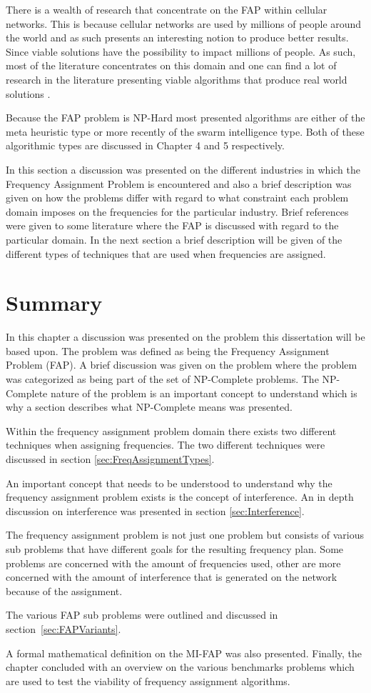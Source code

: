 There is a wealth of research that concentrate on the FAP within cellular networks. This is because cellular networks are used by millions of people around the world and as such presents an interesting notion to produce better results. Since viable solutions have the possibility to impact millions of people. As such, most of the literature concentrates on this domain and one can find a lot of research in the literature presenting viable algorithms that produce real world solutions \cite{Eisenblatter}. 

Because the FAP problem is NP-Hard most presented algorithms are either of the meta heuristic type or more recently of the swarm intelligence type. Both of these algorithmic types are discussed in Chapter 4 and 5 respectively.

In this section a discussion was presented on the different industries in which the Frequency Assignment Problem is encountered and also a brief description was given on how the problems differ with regard to what constraint each problem domain imposes on the frequencies for the particular industry. 
Brief references were given to some literature where the FAP is discussed with regard to the particular domain. In the next section a brief description will be given of the different types of techniques that are used when frequencies are assigned.
\section{Summary}
In this chapter a discussion was presented on the problem this dissertation will be based upon. The problem was defined as being the Frequency Assignment Problem (FAP). A brief discussion was given on the problem where the problem was categorized as being part of the set of NP-Complete problems. The NP-Complete nature of the problem is an important concept to understand which is why a section describes what NP-Complete means was presented.

Within the frequency assignment problem domain there exists two different techniques when assigning frequencies. The two different techniques were discussed in section \ref{sec:FreqAssignmentTypes}. 

An important concept that needs to be understood to understand why the frequency assignment problem exists is the concept of interference. An in depth discussion on interference was presented in section \ref{sec:Interference}.

The frequency assignment problem is not just one problem but consists of various sub problems that have different goals for the resulting frequency plan. Some problems are concerned with the amount of frequencies used, other are more concerned with the amount of interference that is generated on the network because of the assignment.

The various FAP sub problems were outlined and discussed in section~\ref{sec:FAPVariants}.

A formal mathematical definition on the MI-FAP was also presented. Finally, the chapter concluded with an overview on the various benchmarks problems which are used to test the viability of frequency assignment algorithms.
